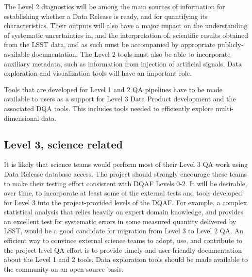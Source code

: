 \documentclass[SE,toc,lsstdraft]{lsstdoc}
\begin{document}
The Level 2 diagnostics will be among the main sources of information for establishing
whether a Data Release is ready, and for quantifying its characteristics. Their outputs will also have a
major impact on the understanding of systematic uncertainties in, and the interpretation of, scientific
results obtained from the LSST data, and as such must be accompanied by appropriate publicly-available documentation.
The Level 2 tools must also be able to incorporate auxiliary metadata, such as information
from injection of artificial signals. Data exploration and visualization tools will have
an important role.

Tools that are developed for Level 1 and 2 QA pipelines have to be made available
to users as a support for Level 3 Data Product development and the associated DQA tools.  This includes tools
needed to efficiently explore multi-dimensional data.

\subsection{Level 3, science related}

It is likely that science teams would perform most of their Level 3 QA work using
Data Release database access. The project should strongly encourage these teams
to make their testing effort consistent with DQAF Levels 0-2. It will be desirable, over time, to
incorporate at least some of the external tests and tools developed for Level 3 into the project-provided
levels of the DQAF. For example, a complex
statistical analysis that relies heavily on expert domain knowledge, and provides
an excellent test for systematic errors in some measured quantity delivered by LSST,
would be a good candidate for migration from Level 3 to Level 2 QA.
An efficient way to convince external science teams to adopt, use, and contribute to
the project-level QA effort is to provide timely and user-friendly documentation about the
Level 1 and 2 tools. Data exploration tools should be made available to the community on an open-source basis.
\end{document}

